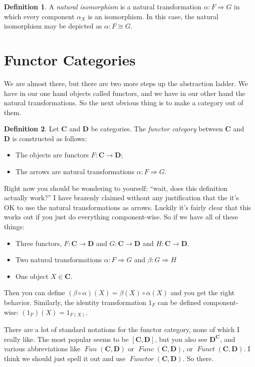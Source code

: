 \documentclass[12pt]{article}
\theoremstyle{definition}
\theoremstyle{definition}
\newtheorem{defn}{Definition}[]
\theoremstyle{definition}
\numberwithin{equation}{section}
\newcommand{\cat}[1]{\mathbf{#1}}      %
\newcommand{\CC}{\cat{C}}
\newcommand{\DD}{\cat{D}}
\DeclareMathOperator{\Fun}{\mathit{Functor}}
\newcommand{\iso}{\cong}                %
\newcommand{\fto}{\Rightarrow}
\def\ni{\goodbreak\noindent}
\begin{document}
\begin{defn}
A {\it natural isomorphism} is a natural transformation $\alpha: F \fto G$ in which every
component $\alpha_X$ is an isomorphism. In this case, the natural isomorphism may be
depicted as $\alpha: F \iso G$.
\end{defn}

\section{Functor Categories}

We are almost there, but there are two more steps up the abstraction ladder. We have in
our one hand objects called functors, and we have in our other hand the natural
transformations. So the next obvious thing is to make a category out of them.

\begin{defn}
 Let $\CC$ and $\DD$ be categories. The \emph{functor category} between $\CC$ and $\DD$ is
 constructed as follows:
 \begin{itemize}
  \item The objects are functors $F: \CC \to \DD$;
  \item The arrows are natural transformations $\alpha:F\fto G$.
 \end{itemize}
\end{defn}
\ni
Right now you should be wondering to yourself: ``wait, does this definition actually
work?'' I have brazenly claimed without any justification that the it's OK to use the
natural transformations as arrows. Luckily it's fairly clear that this works out if you
just do everything component-wise. So if we have all of these things: 
\begin{itemize}
\item Three functors, $F: \CC \to \DD$ and $G: \CC \to \DD$ and $H:\CC \to \DD$.

\item Two natural transformations $\alpha: F \fto G$ and $\beta: G \fto H$

\item One object $X \in \CC$.
\end{itemize}
\ni
Then you can define $(\beta \circ \alpha)(X) = \beta(X) \circ \alpha(X)$ and you get the
right behavior. Similarly, the identity transformation $1_F$ can be defined
component-wise: $(1_F)(X) = 1_{F(X)}$.

There are a lot of standard notations for the functor category,
none of which I really like. The
most popular seems to be $[\CC, \DD]$, but you also see $\DD^{\CC}$, and various  
abbreviations like $\mathop{\mathit{Fun}}(\CC,\DD)$ or $\mathop{\mathit{Func}}(\CC,\DD)$,
or $\mathop{\mathit{Funct}}(\CC,\DD)$. I think we should just spell it out and use
$\Fun(\CC,\DD)$. So there.
\end{document}
